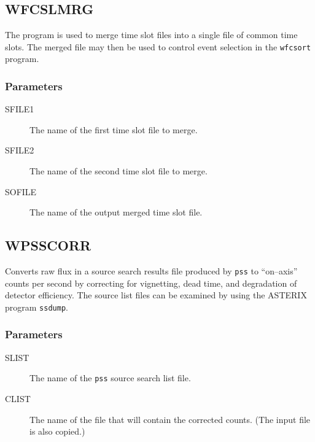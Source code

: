 \subsection{WFCSLMRG}
\label{sec:programs:wfcslmrg}

The program is used to merge time slot files into a single file of common
time slots. The merged file may then be used to control event selection in
the {\tt wfcsort} program.

\subsubsection{Parameters}

\begin{description}

\item[SFILE1]
The name of the first time slot file to merge.

\item[SFILE2]
The name of the second time slot file to merge.

\item[SOFILE]
The name of the output merged time slot file.

\end{description}

\subsection{WPSSCORR}
\label{sec:programs:wpsscorr}

Converts raw flux in a source search results file produced by {\tt pss} to
``on--axis'' counts per second by correcting for vignetting, dead time,
and degradation of detector efficiency.  The source list files can be
examined by using the ASTERIX program {\tt ssdump}.

\subsubsection{Parameters}

\begin{description}

\item[SLIST]
The name of the {\tt pss} source search list file.

\item[CLIST]
The name of the file that will contain the corrected counts.  (The input
file is also copied.)

\end{description}

